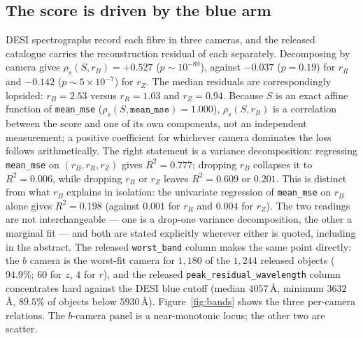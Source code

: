 \documentclass[aps,prd,twocolumn,superscriptaddress,nofootinbib,longbibliography,floatfix]{revtex4-2}
\begin{document}
\subsection{The score is driven by the blue arm}
\label{sec:blue}
DESI spectrographs record each fibre in three cameras, and the released
catalogue carries the reconstruction residual of each separately.
Decomposing by camera gives $\rho_s(S, r_B) = +0.527$ ($p \sim 10^{-89}$),
against $-0.037$ ($p = 0.19$) for $r_R$ and $-0.142$ ($p \sim 5\times10^{-7}$)
for $r_Z$.
The median residuals are correspondingly lopsided: $r_B = 2.53$ versus
$r_R = 1.03$ and $r_Z = 0.94$.
Because $S$ is an exact affine function of \texttt{mean\_mse}
($\rho_s(S,\texttt{mean\_mse})=1.000$), $\rho_s(S,r_B)$ is a correlation
between the score and one of its own components, not an independent
measurement; a positive coefficient for whichever camera dominates the loss
follows arithmetically. The right statement is a variance decomposition:
regressing \texttt{mean\_mse} on $(r_B,r_R,r_Z)$ gives $R^2=0.777$; dropping
$r_B$ collapses it to $R^2=0.006$, while dropping $r_R$ or $r_Z$ leaves
$R^2=0.609$ or $0.201$. This is distinct from what $r_B$ explains in
isolation: the univariate regression of \texttt{mean\_mse} on $r_B$ alone
gives $R^2=0.198$ (against $0.001$ for $r_R$ and $0.004$ for $r_Z$). The two
readings are not interchangeable --- one is a drop-one variance
decomposition, the other a marginal fit --- and both are stated explicitly
wherever either is quoted, including in the abstract.
The released \texttt{worst\_band} column makes the
same point directly: the $b$ camera is the worst-fit camera for $1{,}180$ of
the $1{,}244$ released objects ($94.9\%$; $60$ for $z$, $4$ for $r$), and the
released \texttt{peak\_residual\_wavelength} column concentrates hard against
the DESI blue cutoff (median $4057$\,\AA, minimum $3632$\,\AA, $89.5\%$ of
objects below $5930$\,\AA).
Figure~\ref{fig:bands} shows the three per-camera relations. The $b$-camera
panel is a near-monotonic locus; the other two are scatter.
\end{document}
